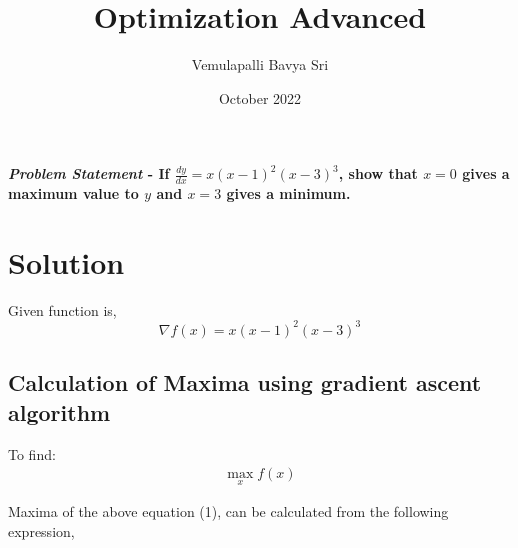 \documentclass[10pt,twocolumn]{article}
\title{\textbf{Optimization Advanced}}
\author{Vemulapalli Bavya Sri}
\date{October 2022}
\begin{document}
\maketitle
\paragraph{\textit{Problem Statement} - If $\frac{dy}{dx} = x(x-1)^2(x-3)^3$, show that $x=0$ gives a maximum value to $y$ and $x=3$ gives a minimum.}

\section{Solution}
\begin{flushleft}
Given function is,\\
\begin{equation}
    \nabla f(x) = x(x-1)^2(x-3)^3
\end{equation}
\end{flushleft}


\subsection{Calculation of Maxima using gradient ascent algorithm}

To find:
\begin{align}
\max_{x} f(x)
\end{align}  
\begin{flushleft}
Maxima of the above equation (1), can be calculated from the following expression,
\end{flushleft}
\end{document}

